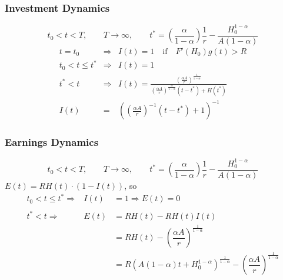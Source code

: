 \documentclass[12pt,compress,handout]{beamer}  %
\begin{document}
\begin{frame}
\frametitle{Investment Dynamics}
\begin{equation*}
    t_{0} < t < T, \qquad T \rightarrow \infty, \qquad t^{*} = \left( \frac{\alpha}{1-\alpha} \right) \frac{1}{r} -
    \frac{H_{0}^{1-\alpha}}{A(1-\alpha)}
\end{equation*}
\begin{eqnarray*}
  t = t_{0} &\Rightarrow& I(t) = 1 \quad \text{if} \quad F'(H_{0})g(t) > R \\
  t_{0} < t \leq t^{*} &\Rightarrow& I(t) = 1 \\
  t^{*} < t &\Rightarrow& I(t) = \frac{\left(
    \frac{\alpha A}{r} \right)^{\frac{1}{1-\alpha}}}
    {\left( \frac{\alpha A}{r}
    \right)^{\frac{\alpha}{1-\alpha}}(t - t^{*}) + H(t^{*})} \\
    I(t) &=& \left( \left( \frac{\alpha A}{r} \right)^{-1} (t - t^{*}) + 1 \right)^{-1}
\end{eqnarray*}
\end{frame}


\begin{frame}
\frametitle{Earnings Dynamics}
\begin{equation*}
    t_{0} < t < T, \qquad T \rightarrow \infty, \qquad t^{*} = \left( \frac{\alpha}{1-\alpha} \right) \frac{1}{r} -
    \frac{H_{0}^{1-\alpha}}{A(1-\alpha)}
\end{equation*}
$E(t) = RH(t)\cdot (1-I(t))$, so
\begin{equation*}
    \begin{array}{rll}
      t_{0} < t \leq t^{*} \Rightarrow & I(t) & = 1 \Rightarrow E(t)=0\\
      & & \\
      t^{*} < t \Rightarrow & E(t) & = RH(t)-RH(t)I(t) \\
      & & = RH(t)-\left( \dfrac{\alpha A}{r}\right)^{\frac{1}{1-\alpha }} \\
      & & = R (A(1-\alpha)t +
        H_{0}^{1-\alpha})^{\frac{1}{1-\alpha}} -\left( \dfrac{\alpha A}{r}\right)^{\frac{1}{1-\alpha }}
    \end{array}
\end{equation*}
\end{frame}
\end{document}
